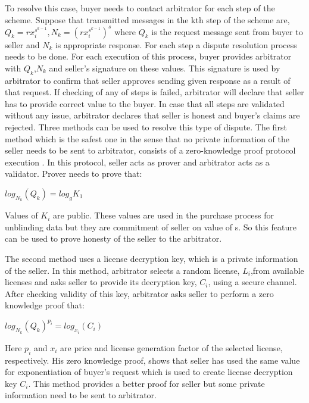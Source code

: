 \documentclass[times]{secauth}
\begin{document}
To resolve this case, buyer needs to contact arbitrator for each step of the scheme. Suppose that transmitted messages in the kth step of the scheme are, $Q_k=rx_i^{s^{k-1} },N_k=(rx_i^{s^{k-1}})^s$ where $Q_k$ is the request message sent from buyer to seller and $N_k$ is appropriate response. For each step a dispute resolution process needs to be done. For each execution of this process, buyer provides arbitrator with $Q_k$,$N_k$ and seller's signature on these values. This signature is used by arbitrator to confirm that seller approves sending given response as a result of that request. If checking of any of steps is failed, arbitrator will declare that seller has to provide correct value to the buyer. In case that all steps are validated without any issue, arbitrator declares that seller is honest and buyer's claims are rejected.
Three methods can be used to resolve this type of dispute. The first method which is the safest one in the sense that no private information of the seller needs to be sent to arbitrator, consists of a zero-knowledge proof protocol execution \cite{N36, N37}. In this protocol, seller acts as prover and arbitrator acts as a validator. Prover needs to prove that:

\begin{center}
$log_{N_k}(Q_k)=log_g{K_1}$
\end{center}

Values of $K_i$ are public. These values are used in the purchase process for unblinding data but they are commitment of seller on value of s. So this feature can be used to prove honesty of the seller to the arbitrator.

The second method uses a license decryption key, which is a private information of the seller. In this method, arbitrator selects a random license, $L_i$,from available licenses and asks seller to provide its decryption key, $C_i$, using a secure channel. After checking validity of this key, arbitrator asks seller to perform a zero knowledge proof \cite{N37, N38}  that:

\begin{center}
$log_{N_k}(Q_k)^{p_i}=log_{x_i}(C_i)$
\end{center}

Here $p_i$ and $x_i$ are price and license generation factor of the selected license, respectively. His zero knowledge proof, shows that seller has used the same value for exponentiation of buyer's request which is used to create license decryption key $C_i$. This method provides a better proof for seller but some private information need to be sent to arbitrator.
\end{document}
